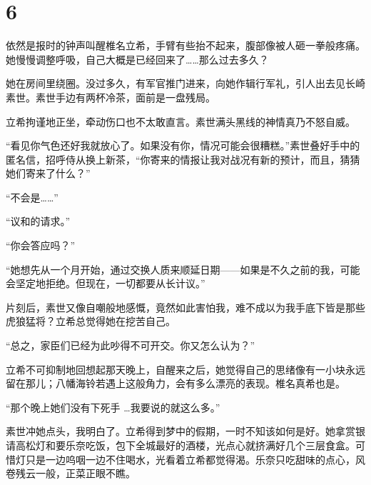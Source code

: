 \documentclass{article}
\begin{document}
{\centering\section*{6}}





依然是报时的钟声叫醒椎名立希，手臂有些抬不起来，腹部像被人砸一拳般疼痛。她慢慢调整呼吸，自己大概是已经回来了……那么过去多久？



她在房间里绕圈。没过多久，有军官推门进来，向她作辑行军礼，引人出去见长崎素世。素世手边有两杯冷茶，面前是一盘残局。



立希拘谨地正坐，牵动伤口也不太敢直言。素世满头黑线的神情真乃不怒自威。



“看见你气色还好我就放心了。如果没有你，情况可能会很糟糕。”素世叠好手中的匿名信，招呼侍从换上新茶，“你寄来的情报让我对战况有新的预计，而且，猜猜她们寄来了什么？”



“不会是……”



“议和的请求。”



“你会答应吗？”



“她想先从一个月开始，通过交换人质来顺延日期——如果是不久之前的我，可能会坚定地拒绝。但现在，一切都要从长计议。”



片刻后，素世又像自嘲般地感慨，竟然如此害怕我，难不成以为我手底下皆是那些虎狼猛将？立希总觉得她在挖苦自己。



“总之，家臣们已经为此吵得不可开交。你又怎么认为？”



立希不可抑制地回想起那天晚上，自醒来之后，她觉得自己的思绪像有一小块永远留在那儿；八幡海铃若遇上这般角力，会有多么漂亮的表现。椎名真希也是。



“那个晚上她们没有下死手 …我要说的就这么多。”



素世冲她点头，我明白了。立希得到梦中的假期，一时不知该如何是好。她拿赏银请高松灯和要乐奈吃饭，包下全城最好的酒楼，光点心就挤满好几个三层食盒。可惜灯只是一边呜咽一边不住喝水，光看着立希都觉得渴。乐奈只吃甜味的点心，风卷残云一般，正菜正眼不瞧。
\end{document}
